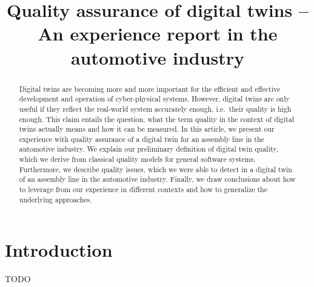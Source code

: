 \documentclass[conference]{IEEEtran}
\begin{document}
    \title{Quality assurance of digital twins -- An experience report in the automotive industry}
    \author{
        \and
    }
    \maketitle

    \begin{abstract}
        Digital twins are becoming more and more important for the efficient and effective development and operation of cyber-physical systems.
        However, digital twins are only useful if they reflect the real-world system accurately enough, i.e.\ their quality is high enough.
        This claim entails the question, what the term quality in the context of digital twins actually means and how it can be measured.
        In this article, we present our experience with quality assurance of a digital twin for an assembly line in the automotive industry.
        We explain our preliminary definition of digital twin quality, which we derive from classical quality models for general software systems.
        Furthermore, we describe quality issues, which we were able to detect in a digital twin of an assembly line in the automotive industry.
        Finally, we draw conclusions about how to leverage from our experience in different contexts and how to generalize the underlying approaches.
    \end{abstract}

    \section{Introduction}
    \label{section:introduction}
    TODO~\cite{Boschert2016,Fuller2020,Jones2020}
\end{document}

